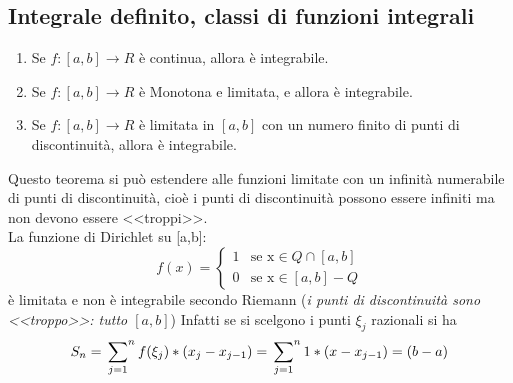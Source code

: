 \documentclass{book}
\begin{document}
\subsection{Integrale definito, classi di funzioni integrali}
\begin{enumerate}
	\item Se $f:[a,b]\to R$ è continua, allora è integrabile.
	\item Se $f:[a,b]\to R$ è Monotona e limitata, e allora è integrabile.
	\item Se $f:[a,b]\to R$ è limitata in $[a,b]$ con un numero finito di punti di discontinuità, allora è integrabile.
\end{enumerate}
Questo teorema si può estendere alle funzioni limitate con un infinità numerabile di punti di discontinuità, cioè i punti di discontinuità possono essere infiniti ma non devono essere <<troppi>>.\\
La funzione di Dirichlet su [a,b]:
\begin{equation*}
f(x)=\begin{cases}
		1 &\text{se x}\in Q \cap [a,b]\\
		0&\text{se x}\in [a,b] -Q
	\end{cases}
\end{equation*}
è limitata e non è integrabile secondo Riemann (\textit{i punti di discontinuità sono <<troppo>>: tutto $[a,b]$}) Infatti se si scelgono i punti $\xi_j$ razionali si ha
\begin{equation*}
	S_n=\sideset{}{^n}\sum_{j=1}f(\xi_j)*(x_j-x_{j-1})=\sideset{}{^n}\sum_{j=1}1*(x-x_{j-1})=(b-a)
\end{equation*} 
\end{document}

